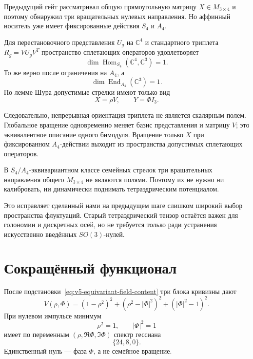 Предыдущий гейт рассматривал общую прямоугольную матрицу
$X\in M_{3\times4}$ и поэтому обнаружил три вращательных нулевых направления.
Но аффинный носитель уже имеет фиксированные действия $S_4$ и $A_4$.

Для перестановочного представления $U_g$ на $\mathbb C^4$ и стандартного
триплета $R_g=VU_gV^T$ пространство сплетающих операторов удовлетворяет
\begin{equation}
 \dim\operatorname{Hom}_{S_4}(\mathbb C^4,\mathbb C^3)=1.
\end{equation}
То же верно после ограничения на $A_4$, а
\begin{equation}
 \dim\operatorname{End}_{A_4}(\mathbb C^3)=1.
\end{equation}
По лемме Шура допустимые стрелки имеют только вид
\begin{equation}
 \boxed{
 X=\rho V,
 \qquad
 Y=\Phi I_3.
 }
 \label{eq:v5-equivariant-field-content}
\end{equation}

Следовательно, непрерывная ориентация триплета не является скалярным полем.
Глобальное вращение одновременно меняет базис представления и матрицу
$V$; это эквивалентное описание одного бимодуля. Вращение только $X$ при
фиксированном $A_4$-действии выходит из пространства допустимых
сплетающих операторов.

\begin{theorem}
В $S_4/A_4$-эквивариантном классе семейных стрелок три вращательных
направления общего $M_{3\times4}$ не являются полями. Поэтому их не нужно
ни калибровать, ни динамически поднимать тетраэдрическим потенциалом.
\end{theorem}

Это исправляет сделанный нами на предыдущем шаге слишком широкий выбор
пространства флуктуаций. Старый тетраэдрический тензор остаётся важен для
голономии и дискретных осей, но не требуется только ради устранения
искусственно введённых $SO(3)$-нулей.

\section{Сокращённый функционал}

После подстановки~\eqref{eq:v5-equivariant-field-content} три блока
кривизны дают
\begin{equation}
 V(\rho,\Phi)
 =(1-\rho^2)^2
 +(\rho^2-|\Phi|^2)^2
 +( |\Phi|^2-1)^2.
 \label{eq:v5-equivariant-radial-potential}
\end{equation}
При нулевом импульсе минимум
\begin{equation}
 \rho^2=1,
 \qquad |\Phi|^2=1
\end{equation}
имеет по переменным $(\rho,\Re\Phi,\Im\Phi)$ спектр гессиана
\begin{equation}
 \{24,8,0\}.
\end{equation}
Единственный нуль --- фаза $\Phi$, а не семейное вращение.

